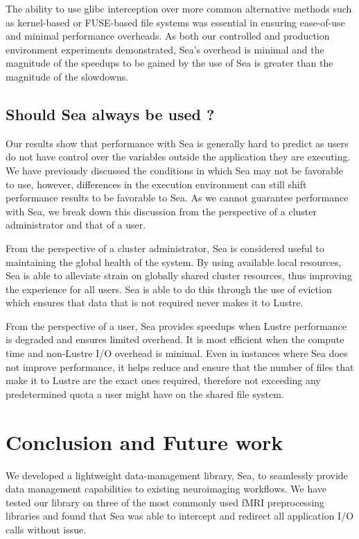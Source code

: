 \documentclass[pdflatex,sn-mathphys-num]{sn-jnl}
\theoremstyle{thmstyleone}%
\theoremstyle{thmstyletwo}%
\theoremstyle{thmstylethree}%
\begin{document}
    The ability to use glibc interception over more common alternative methods
    such as kernel-based or FUSE-based file systems was essential in ensuring
    ease-of-use and minimal performance overheads. As both our controlled and
    production environment experiments demonstrated, Sea's overhead is minimal
    and the magnitude of the speedups to be gained by the use of Sea is
    greater than the magnitude of the slowdowns.
    
    \subsection{Should Sea always be used ?}
    
    Our results show that performance with Sea is generally hard to predict as
    users do not have control over the variables outside the application they
    are executing. We have previously discussed the conditions in which Sea may
    not be favorable to use, however, differences in the execution environment
    can still shift performance results to be favorable to Sea. As we cannot
    guarantee performance with Sea, we break down this discussion from the
    perspective of a cluster administrator and that of a user.

    From the perspective of a cluster administrator, Sea is considered useful to
    maintaining the global health of the system. By using available local
    resources, Sea is able to alleviate strain on globally shared cluster
    resources, thus improving the experience for all users. Sea is able to do
    this through the use of eviction which ensures that data that is not
    required never makes it to Lustre.


    From the perspective of a user, Sea provides speedups when
    Lustre performance is degraded and ensures limited overhead. It is most efficient
    when the compute time and non-Lustre I/O overhead is minimal. Even in
    instances where Sea does not improve performance, it helps reduce and ensure
    that the number of files that make it to Lustre are the exact ones required,
    therefore not exceeding any predetermined quota a user might have on the
    shared file system. 

    \section{Conclusion and Future work}

    We developed a lightweight data-management library, Sea, to seamlessly
    provide data management capabilities to existing neuroimaging workflows. We
    have tested our library on three of the most commonly used fMRI
    preprocessing libraries and found that Sea was able to intercept and
    redirect all application I/O calls without issue. 
\end{document}
